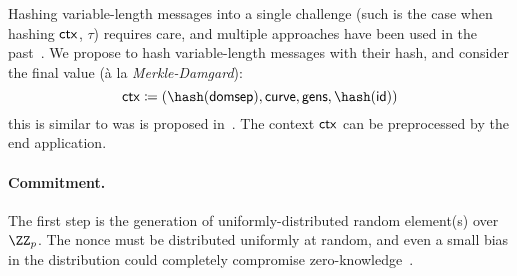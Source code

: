 \documentclass[runningheads,11pt]{article}
\begin{document}

Hashing variable-length messages into a single challenge (such is the case when hashing $\mathsf{ctx}$, $\tau$) requires care, and multiple approaches have been used in the past~\cite{EPRINT:Hamburg17, hash-to-curve}.
We propose to hash variable-length messages with their hash, and consider the final value (à la \emph{Merkle-Damgard}):
  \[
    \ctx \defeq (\hash(\domsepctx), \curvectx, \generatorsctx, \hash(\idctx))
  \]
  this is similar to was is proposed in~\cite{bip-schnorr}.
  The context $\mathsf{ctx}$ can be preprocessed by the end application.

\paragraph{Commitment.} The first step is the generation of uniformly-distributed random element(s) over $\ZZ_p$. The nonce must be distributed uniformly at random, and even a small bias in the distribution could completely compromise zero-knowledge~\cite{lattice-attack,bleichenbacher,CCS:ANTTY20}.
\end{document}
